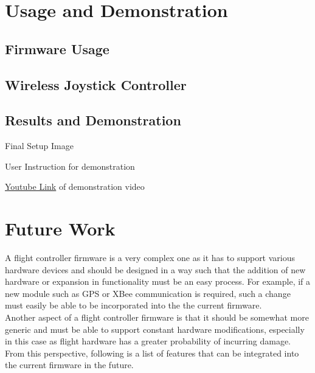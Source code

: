 \documentclass[a4paper,12pt,oneside]{book}
\begin{document}
\chapter[Usage and Demonstration]{Usage and Demonstration}

\section{Firmware Usage}

\section{Wireless Joystick Controller}
\label{sec:joystick}

\section{Results and Demonstration}

Final Setup Image

User Instruction for demonstration

\href{http://www.youtube.com}{Youtube Link} of demonstration video 

\chapter[Future Work]{Future Work}
A flight controller firmware is a very complex one as it has to support various hardware devices and should be designed in a way such that the addition of new hardware or expansion in functionality must be an easy process. For example, if a new module such as GPS or XBee communication is required, such a change must easily be able to be incorporated into the the current firmware.\\

Another aspect of a flight controller firmware is that it should be somewhat more generic and must be able to support constant hardware modifications, especially in this case as flight hardware has a greater probability of incurring damage. From this perspective, following is a list of features that can be integrated into the current firmware in the future.\\
\end{document}
